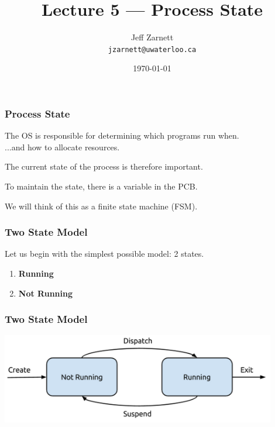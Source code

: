 

\title{Lecture 5 --- Process State}

\author{Jeff Zarnett \\ \small \texttt{jzarnett@uwaterloo.ca}}
\date{\today}




\begin{frame}
  \titlepage

 \end{frame}

\begin{frame}
\frametitle{Process State}

The OS is responsible for determining which programs run when.\\
\quad ...and how to allocate resources.

The current state of the process is therefore important.

To maintain the state, there is a variable in the PCB.

We will think of this as a finite state machine (FSM).

\end{frame}

\begin{frame}
\frametitle{Two State Model}
Let us begin with the simplest possible model: 2 states.

\begin{enumerate}
	\item \textbf{Running}
	\item \textbf{Not Running}
\end{enumerate}


\end{frame}

\begin{frame}
\frametitle{Two State Model}

\begin{center}
\includegraphics[width=0.9\textwidth]{images/2-state-model.png}
\end{center}

\end{frame}


